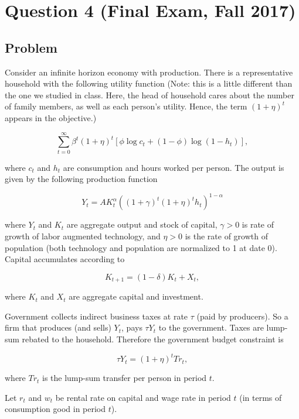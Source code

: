 \documentclass[10pt, a4paper]{article}
\begin{document}
\section*{Question 4 (Final Exam, Fall 2017)}
  \subsection*{Problem}
    Consider an infinite horizon economy with production. There is a representative household with the following utility function (Note: this is a little different than the one we studied in class. Here, the head of household cares about the number of family members, as well as each person's utility. Hence, the term $(1+\eta)^t$ appears in the objective.)

    \[\sum_{t=0}^{\infty} \beta^t (1+\eta)^t [\phi \log c_t + (1-\phi)\log(1-h_t)],\]

    where $c_t$ and $h_t$ are consumption and hours worked per person. The output is given by the following production function

    \[Y_t = AK_t^\alpha((1+\gamma)^t(1+\eta)^th_t)^{1-\alpha}\]

    where $Y_t$ and $K_t$ are aggregate output and stock of capital, $\gamma > 0$ is rate of growth of labor augmented technology, and $\eta > 0$ is the rate of growth of population (both technology and population are normalized to 1 at date 0). Capital accumulates according to

    \[K_{t+1} = (1-\delta)K_t + X_t,\]

    where $K_t$ and $X_t$ are aggregate capital and investment.

    Government collects indirect business taxes at rate $\tau$ (paid by producers). So a firm that produces (and sells) $Y_t$, pays $\tau Y_t$ to the government. Taxes are lump-sum rebated to the household. Therefore the government budget constraint is

    \[\tau Y_t = (1+\eta)^t Tr_t,\]

    where $Tr_t$ is the lump-sum transfer per person in period $t$.

    Let $r_t$ and $w_t$ be rental rate on capital and wage rate in period $t$ (in terms of consumption good in period $t$).
\end{document}
